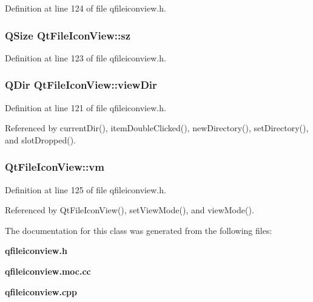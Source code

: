 Definition at line 124 of file qfileiconview.h.
\subsubsection{\setlength{\rightskip}{0pt plus 5cm}QSize {\bf Qt\-File\-Icon\-View::sz}\hspace{0.3cm}{\tt  [protected]}}\label{classQtFileIconView_QtFileIconViewp2}




Definition at line 123 of file qfileiconview.h.
\subsubsection{\setlength{\rightskip}{0pt plus 5cm}QDir {\bf Qt\-File\-Icon\-View::view\-Dir}\hspace{0.3cm}{\tt  [protected]}}\label{classQtFileIconView_QtFileIconViewp0}




Definition at line 121 of file qfileiconview.h.

Referenced by current\-Dir(), item\-Double\-Clicked(), new\-Directory(), set\-Directory(), and slot\-Dropped().
\subsubsection{ {\bf Qt\-File\-Icon\-View::vm}\hspace{0.3cm}{\tt  [protected]}}\label{classQtFileIconView_QtFileIconViewp4}




Definition at line 125 of file qfileiconview.h.

Referenced by Qt\-File\-Icon\-View(), set\-View\-Mode(), and view\-Mode().

The documentation for this class was generated from the following files:\begin{CompactItemize}
\item 
{\bf qfileiconview.h}\item 
{\bf qfileiconview.moc.cc}\item 
{\bf qfileiconview.cpp}\end{CompactItemize}

